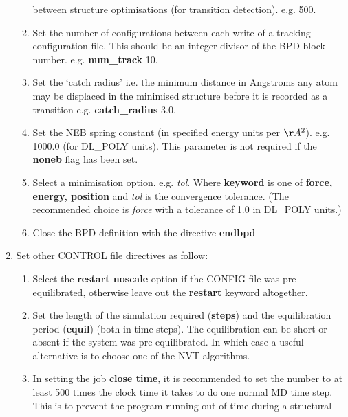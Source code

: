 \begin{enumerate}
\begin{enumerate}
      between structure optimisations (for transition
      detection). e.g.  500.
\item Set the number of configurations between each write of a tracking
      configuration file. This should be an integer divisor of the BPD
      block number. e.g. \newline
      {\bf num\_track} 10.
\item Set the `catch radius' i.e. the minimum distance 
      in Angstroms any atom may be displaced in the minimised structure 
      before it is recorded as a transition e.g. \newline 
      {\bf catch\_radius} 3.0.
\item Set the NEB spring constant (in specified energy units per $\AA^2$). 
       e.g.  1000.0 (for DL\_POLY units).
       This parameter is not required if the {\bf noneb} flag has been set.
\item Select a minimisation option.  e.g. 
       {\em tol}.\newline 
      Where {\bf keyword} is one of {\bf force, energy, position} and {\em
      tol} is the convergence tolerance.
      (The recommended choice is {\em force} with a tolerance 
      of 1.0 in DL\_POLY units.)
\item Close the BPD definition with the directive \newline
      {\bf endbpd}
\end{enumerate}
\item Set other CONTROL file directives as follow:
\begin{enumerate}
\item Select the {\bf restart noscale} option if the CONFIG file was
      pre-equilibrated, otherwise leave out the {\bf restart} keyword 
      altogether.
\item Set the length of the simulation required ({\bf steps}) and the 
      equilibration period ({\bf equil}) (both in time steps). The
      equilibration can be short or absent if the system was pre-equilibrated.
      In which case a useful alternative is to choose one of the NVT
      algorithms. 
\item In setting the job {\bf close time}, it is
      recommended to set the number to at least 500 times the clock
      time it takes to do one normal MD time step. This is to prevent
      the program running out of time during a structural

\end{enumerate}
\end{enumerate}
